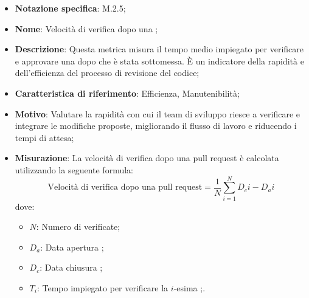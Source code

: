 \begin{itemize}
    \item \textbf{Notazione specifica}: M.2.5;
    \item \textbf{Nome}: Velocità di verifica dopo una ;
    \item \textbf{Descrizione}: Questa metrica misura il tempo medio impiegato per verificare e approvare una  dopo che è stata sottomessa. È un indicatore della rapidità e dell'efficienza del processo di revisione del codice;
    \item \textbf{Caratteristica di riferimento}: Efficienza, Manutenibilità;
    \item \textbf{Motivo}: Valutare la rapidità con cui il team di sviluppo riesce a verificare e integrare le modifiche proposte, migliorando il flusso di lavoro e riducendo i tempi di attesa;
    \item \textbf{Misurazione}: La velocità di verifica dopo una pull request è calcolata utilizzando la seguente formula:
    \[
        \text{Velocità di verifica dopo una pull request} =\frac{1}{N} \sum_{i=1}^{N} D_{c}i - D_{a}i 
    \]
    dove:
    \begin{itemize}
        \item $N$: Numero di  verificate;
        \item $D_{a}$: Data apertura ;
        \item $D_{c}$: Data chiusura ;
        \item $T_{i}$: Tempo impiegato per verificare la \(i\)-esima ;.
    \end{itemize}
\end{itemize}
